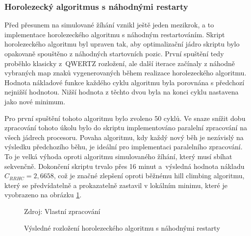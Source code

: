 \documentclass[a4paper, twoside, 12pt, czech]{article}
\begin{document}
\subsubsection{Horolezecký algoritmus s náhodnými restarty}
Před přesunem na simulované žíhání vznikl ještě jeden mezikrok, a to implementace
horolezeckého algoritmu s náhodným restartováním. Skript horolezeckého algoritmu 
byl upraven tak, aby optimalizační jádro skriptu bylo opakovaně spouštěno z náhodných 
startovních pozic. První spuštění tedy proběhlo klasicky z~QWERTZ rozložení, ale 
další iterace začínaly z náhodně vybraných map znaků vygenerovaných během realizace
horolezeckého algoritmu. Hodnota nákladové funkce 
každého cyklu algoritmu byla porovnána s předchozí nejnižší hodnotou. Nižší hodnota
z těchto dvou byla na konci cyklu nastavena jako nové minimum.

Pro první spuštění tohoto algoritmu bylo zvoleno 50 cyklů. Ve snaze snížit dobu 
zpracování tohoto úkolu bylo do skriptu implementováno paralelní zpracování 
na všech jádrech procesoru. Povaha algoritmu, kdy každý nový běh je 
nezávislý na výsledku předchozího běhu, je ideální pro implementaci paralelního 
zpracování. To je velká výhoda oproti algoritmu simulovaného žíhání, který musí 
sbíhat sekvenčně. Dokončení skriptu trvalo přes 16 minut a~výsledná 
hodnota nákladu $C_{RRHC}=2,6658$, což je značné zlepšení oproti běžnému 
hill climbing algoritmu, který se předvídatelně a prokazatelně zastavil v lokálním 
minimu, které je vyobrazeno na obrázku \ref{pic:rrhc}.

\begin{figure}[h!]
    \centering
    \caption{Výsledné rozložení horolezeckého algoritmu s náhodnými restarty}
    \vspace{0.5cm}
    \begin{keyboardlayout}
                     
        \newrow
        
                     
        \newrow
        
                    
        \newrow
        
                   
        \newrow
        
               
    \end{keyboardlayout}
    
    \small{Zdroj: Vlastní zpracování}
    \label{pic:rrhc}
\end{figure}
\end{document}
